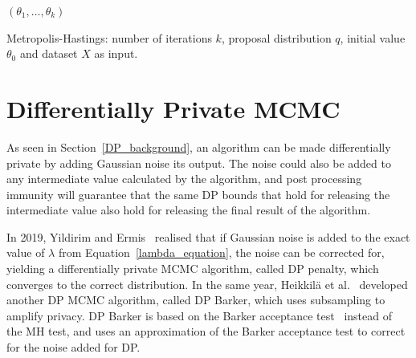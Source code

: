 \documentclass[english,twoside,openright]{HYgraduMLDS}
\begin{document}
\begin{algorithm}[H]\label{MH_algo}
    \SetAlgoLined
    \Return \((\theta_1, \dotsc, \theta_k)\)
    \caption{
        Metropolis-Hastings: number of iterations \(k\), proposal 
        distribution \(q\), initial value \(\theta_0\) and
        dataset \(X\) as input.
    }
\end{algorithm}

\chapter{Differentially Private MCMC}\label{dp_mcmc_chapter}

As seen in Section~\ref{DP_background}, an algorithm can be made differentially 
private by adding Gaussian noise its output. The noise could also be added
to any intermediate value calculated by the algorithm, and post processing immunity 
will guarantee that the same DP bounds that hold for releasing the intermediate 
value also hold for releasing the final result of the algorithm.

In 2019, Yildirim and Ermis~\cite{YildirimE19} realised that if Gaussian noise
is added to the exact value of \(\lambda\) from Equation~\ref{lambda_equation},
the noise can be corrected for,
yielding a differentially private MCMC algorithm, called DP penalty,
which converges to 
the correct distribution. In the same year, Heikkilä et al.~\cite{HeikkilaJDH19}
developed another DP MCMC algorithm, called DP Barker, which uses subsampling 
to amplify privacy. DP Barker is based on the Barker acceptance
test~\cite{Barker65} instead of the MH test, and uses an approximation
of the Barker acceptance test to correct for the noise added for DP.
\end{document}
